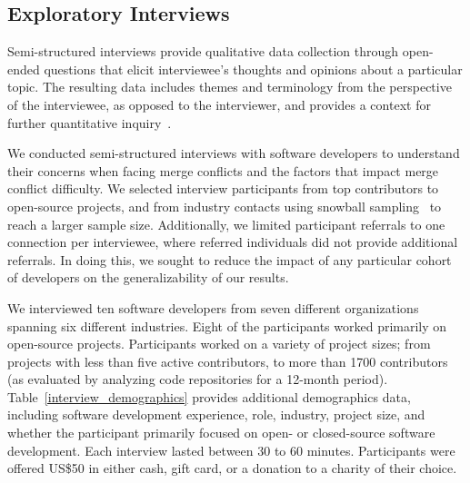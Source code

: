 \subsection{Exploratory Interviews}\label{interviews}

Semi-structured interviews provide qualitative data collection through open-ended questions that elicit interviewee's thoughts and opinions about a particular topic.
The resulting data includes themes and terminology from the perspective of the interviewee, as opposed to the interviewer, and provides a context for further quantitative inquiry~\cite{easterbrook2008selecting}.

We conducted semi-structured interviews with software developers to understand their concerns when facing merge conflicts and the factors that impact merge conflict difficulty.
We selected interview participants from top contributors to open-source projects, and from industry contacts using snowball sampling~\cite{goodman1961snowball} to reach a larger sample size. Additionally, we limited participant referrals to one connection per interviewee, where referred individuals did not provide additional referrals. In doing this, we sought to reduce the impact of any particular cohort of developers on the generalizability  of our results.

We interviewed ten software developers from seven different organizations spanning six different industries.
Eight of the participants worked primarily on open-source projects.
Participants worked on a variety of project sizes; from projects with less than five active contributors, to more than 1700 contributors (as evaluated by analyzing code repositories for a 12-month period).
Table~\ref{interview_demographics} provides additional demographics data, including software development experience, role, industry, project size, and whether the participant primarily focused on open- or closed-source software development.
Each interview lasted between 30 to 60 minutes.
Participants were offered US\$50 in either cash, gift card, or a donation to a charity of their choice.

